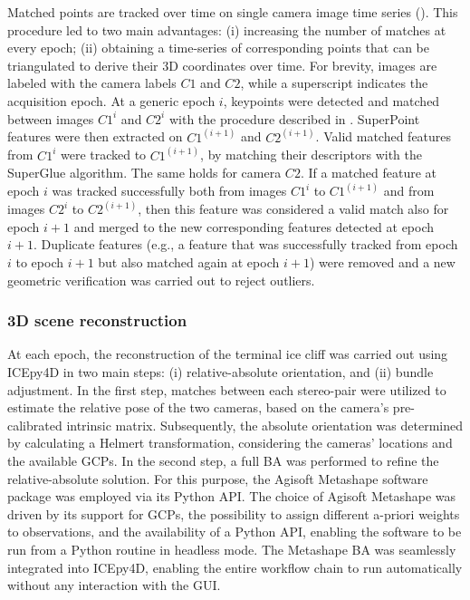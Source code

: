 Matched points are tracked over time on single camera image time series
().
This procedure led to two main advantages: (i) increasing the number of matches
at every epoch; (ii) obtaining a time-series of corresponding points that can be
triangulated to derive their 3D coordinates over time.
For brevity, images are labeled with the camera labels \(C1\) and \(C2\), while a
superscript indicates the acquisition epoch.
At a generic epoch \(i\), keypoints were detected and
matched between images \(C1^i\) and \(C2^i\) with the procedure described
in .
SuperPoint features were then extracted on \(C1^{(i+1)}\) and \(C2^{(i+1)}\).
Valid matched features from \(C1^i\) were tracked to \(C1^{(i+1)}\), by matching their
descriptors with the SuperGlue algorithm.
The same holds for camera \(C2\).
If a matched feature at epoch \(i\) was tracked successfully both from images
\(C1^i\) to \(C1^{(i+1)}\) and from images \(C2^i\) to \(C2^{(i+1)}\), then this feature
was considered a valid match also for epoch \(i+1\) and merged to the new corresponding
features detected at epoch \(i+1\).
Duplicate features (e.g., a feature that was successfully tracked from epoch \(i\) to
epoch \(i+1\) but also matched again at epoch \(i+1\)) were removed and a new geometric
verification was carried out to reject outliers.

\subsubsection{3D scene reconstruction}\label{sec:4:3dreconstruction}

At each epoch, the reconstruction of the terminal ice cliff was carried out using ICEpy4D
in two main steps: (i) relative-absolute orientation, and (ii) bundle adjustment.
In the first step, matches between each stereo-pair were utilized to estimate the
relative pose of the two cameras, based on the camera's pre-calibrated intrinsic matrix.
Subsequently, the absolute orientation was determined by calculating a Helmert
transformation, considering the cameras' locations and the available GCPs.
In the second step, a full BA was performed to refine the relative-absolute solution. For
this purpose, the Agisoft Metashape software package was employed via its Python API.
The choice of Agisoft Metashape was driven by its support for GCPs, the possibility to
assign different a-priori weights to observations, and the availability of a Python API,
enabling the software to be run from a Python routine in headless mode.
The Metashape BA was seamlessly integrated into ICEpy4D, enabling the entire workflow
chain to run automatically without any interaction with the GUI.


